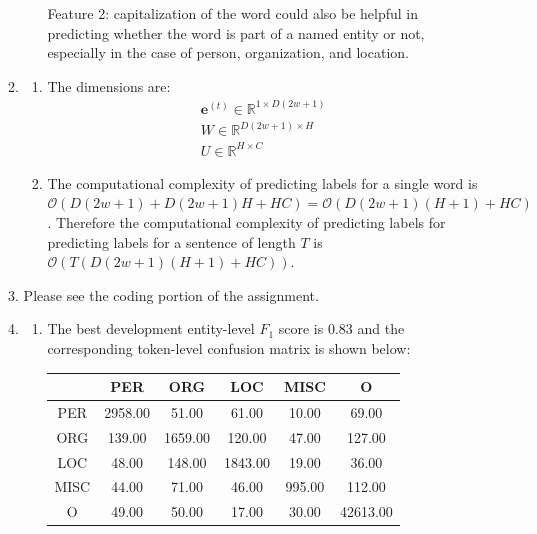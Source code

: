 \documentclass[10pt,reqno]{amsart}
\begin{document}
\begin{enumerate}[topsep=0pt,itemsep=3ex,partopsep=1ex,parsep=1ex]
\begin{enumerate}[itemsep=2ex]
\begin{enumerate}[itemsep=2ex]
        Feature 2: capitalization of the word could also be helpful in predicting 
        whether the word is part of a named entity or not, especially in the case of
        person, organization, and location. 
    \end{enumerate}
  \item 
    \begin{enumerate}[itemsep=2ex]
      \item The dimensions are:
        \begin{align*}
          \bm{e}^{(t)} \in \mathbb{R}^{1 \times D(2w+1)} \\
          W \in \mathbb{R}^{D(2w+1) \times H} \\
          U \in \mathbb{R}^{H \times C} 
        \end{align*}
      \item The computational complexity of predicting labels for a single word is
        $\mathcal{O}(D(2w+1) + D(2w+1)H + HC) = \mathcal{O}(D(2w+1)(H+1) + HC)$.
        Therefore the computational complexity of predicting labels for predicting labels for
        a sentence of length $T$ is
        $\mathcal{O}(T (D(2w+1)(H+1) + HC))$.
    \end{enumerate}
  \item Please see the coding portion of the assignment.
  \item 
    \begin{enumerate}[itemsep=2ex]
      \item The best development entity-level $F_1$ score is 0.83 and 
        the corresponding token-level confusion matrix is shown below:
        \vspace{1mm}
        \begin{center}
          \begin{tabular}{c|c|c|c|c|c}
             & PER  &   ORG  &   LOC  &   MISC  &  O       \\
            \hline
            PER  &    2958.00 & 51.00   & 61.00   & 10.00  &  69.00   \\
            \hline
            ORG  &    139.00  & 1659.00 & 120.00  & 47.00  &  127.00  \\
            \hline
            LOC  &    48.00   & 148.00  & 1843.00 & 19.00  &  36.00   \\
            \hline
            MISC &    44.00   & 71.00   & 46.00   & 995.00 &  112.00  \\
            \hline
            O    &    49.00   & 50.00   & 17.00   & 30.00  &  42613.00

\end{tabular}
\end{center}
\end{enumerate}
\end{enumerate}
\end{enumerate}
\end{document}
